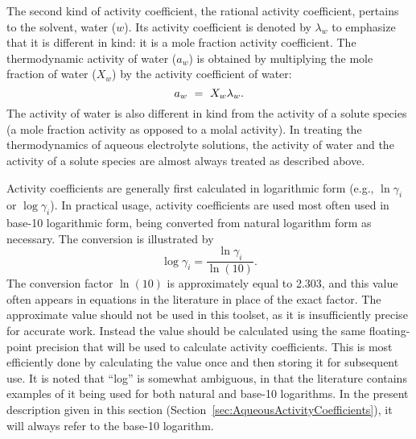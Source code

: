 The second kind of activity coefficient, the rational activity
coefficient, pertains to the solvent, water ($w$). Its activity
coefficient is denoted by $\lambda_{w}$ to emphasize that it is
different in kind: it is a mole fraction activity coefficient. The
thermodynamic activity of water ($a_{w}$) is obtained by multiplying
the mole fraction of water ($X_{w}$) by the activity coefficient of
water:
\begin{equation}
a_{w} \ =\  X_{w} \lambda _{w} .
\end{equation}
The activity of water is also different in kind from the activity of a
solute species (a mole fraction activity as opposed to a molal
activity).  In treating the thermodynamics of aqueous electrolyte solutions,
the activity of water and the activity of a solute species are almost
always treated as described above.

Activity coefficients are generally first calculated in logarithmic
form (e.g., $\ln \gamma_{i}$ or $\log \gamma_{i}$). In practical
usage, activity coefficients are used most often used in base-10
logarithmic form, being converted from natural logarithm form as
necessary. The conversion is illustrated by
\begin{equation}
\log\gamma_{i} =\frac{\ln\gamma_{i}}{\ln (10)}.
\end{equation}
The conversion factor $\ln(10)$ is approximately equal to 2.303, and
this value often appears in equations in the literature in place of
the exact factor. The approximate value should not be used in this
toolset, as it is insufficiently precise for accurate work. Instead
the value should be calculated using the same floating-point precision
that will be used to calculate activity coefficients. This is most
efficiently done by calculating the value once and then storing it for
subsequent use. 
It is noted that ``log'' is somewhat ambiguous, in
that the literature contains examples of it being used for both
natural and base-10 logarithms. In the present description given in this section (Section~\ref{sec:AqueousActivityCoefficients}), 
it will always refer to the base-10 logarithm.

